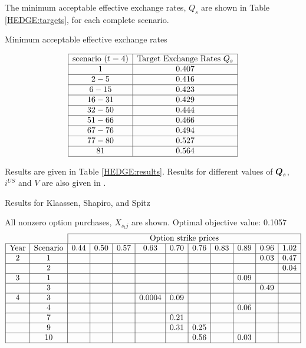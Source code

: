The minimum acceptable effective exchange rates, $Q_s$ are shown in Table \ref{HEDGE:targets}, for each complete scenario.
\begin{table}[ht]
\caption{Minimum acceptable effective exchange rates}
\label{HEDGE:targets}
\[
\begin{array}{|c|c|}
\hline
\mbox{scenario } (t=4)	&	\mbox{Target Exchange Rates } Q_s\\
\hline
1	&	0.407\\
\hline
2 - 5	&	0.416\\
\hline
6 - 15	&	0.423\\
\hline
16 - 31	&	0.429\\
\hline
32 - 50	&	0.444\\
\hline
51 - 66	&	0.466\\
\hline
67 - 76	&	0.494\\
\hline
77 - 80	&	0.527\\
\hline
81	&	0.564\\
\hline
\end{array}
\]
\end{table}
Results are given in Table \ref{HEDGE:results}.  Results for different values of $\mathbf{\boldsymbol{Q}}_s$, $i^{US}$ and $V$ are also given in \cite{klaassen90}.
\begin{table}[ht]
\caption{Results for Klaassen, Shapiro, and Spitz \cite{klaassen90}}
\label{HEDGE:results}
All nonzero option purchases, $X_{s_t j}$ are shown.  Optimal objective value: 0.1057\footnotesize
\[
\begin{array}{|c|c|c|c|c|c|c|c|c|c|c|c|}
\cline{3-12}
\multicolumn{2}{c}{} & \multicolumn{10}{|c|}{\mbox{Option strike prices}} \\
\hline
\mbox{Year} & \mbox{Scenario} & 0.44 & 0.50 & 0.57 & 0.63 & 0.70 & 0.76 & 0.83 & 0.89 & 0.96 & 1.02\\
\hline
2 & 1 & & & & & & & & & 0.03 & 0.47\\
\hline
  & 2 & & & & & & & & &      & 0.04\\
\hline
3 & 1 & & & & & & & & 0.09 & & \\
\hline
  & 3 & & & & & & & & & 0.49 & \\
\hline
4 & 3 & & & & 0.0004 & 0.09 & & & & &\\
\hline
  & 4 & & & & & & & & 0.06 & & \\
\hline
  & 7 & & & & & 0.21 & & & & & \\
\hline
  & 9 & & & & & 0.31 & 0.25 & & & & \\
\hline
  & 10 & & & & & & 0.56 & & 0.03 & & \\
\hline
\end{array}
\]\normalsize
\end{table}%


